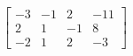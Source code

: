 \documentclass[preview]{standalone}
\begin{document}
\begin{align*}
\left[\begin{array}{ccc|c}-3 & -1 & 2 & -11 \\2 & 1 & -1 & 8 \\-2 & 1 & 2 & -3\end{array}\right]
\end{align*}
\end{document}
